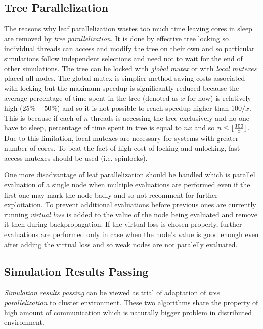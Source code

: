 \subsection{Tree Parallelization}


The reasons why leaf parallelization wastes too much time leaving cores in sleep are removed by
\emph{tree parallelization}. It is done by effective tree locking so individual threads can access
and modify the tree on their own and so particular simulations follow independent selections and
need not to wait for the end of other simulations. The tree can be locked with \emph{global mutex}
or with \emph{local mutexes} placed all nodes. The global mutex is simplier method saving costs
associated with locking but the maximum speedup is significantly reduced because the average
percentage of time spent in the tree (denoted as $x$ for now) is relatively high ($25\%-50\%$) and
so it is not possible to reach speedup higher than $100/x$. This is because if each of $n$
threads is
accessing the tree exclusively and no one have to sleep, percentage of time spent in 
tree is
equal to $n x$ and so $n \le \lfloor {100 \over{x}} \rfloor$. Due to this limitation, local mutexes
are necessary for systems with greater number of cores. To beat the fact of high cost of locking and
unlocking, fast-access mutexes should be used (i.e. spinlocks).

One more disadvantage of leaf parallelization should be handled which is parallel evaluation of a
single node when multiple evaluations are performed even if the first one may mark the node badly
and so not recomment for further exploitation. To prevent additional evaluations before previous
ones are currently running \emph{virtual loss} is added to the value of the node being evaluated
and remove it then during backpropagation.
If the virtual loss is chosen properly, further evaluations are performed only in case when the
node's value is good enough even after adding the virtual loss and so weak nodes are not paralelly
evaluated.

\subsection{Simulation Results Passing}


\emph{Simulation results passing} can be viewed as trial of adaptation of \emph{tree
parallelization} to cluster environment. These two algorithms share the property of high amount of
communication which is naturally bigger problem in distributed environment.

